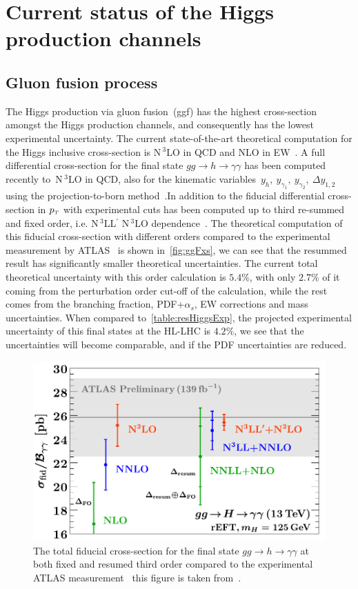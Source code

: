 \section{Current status of the Higgs production channels  \label{sec:singlehiggschannels}  }
\subsection{Gluon fusion process}
The Higgs production via gluon fusion~(ggf)  has the highest cross-section amongst the Higgs production channels, and consequently has the lowest experimental uncertainty. The current state-of-the-art theoretical computation for the Higgs inclusive cross-section is N$\,^3$LO in QCD and NLO in EW~\cite{Bonetti:2018ukf}. A full differential cross-section for the final state $ gg \to h \to \gamma \gamma$ has been computed recently to~N$\,^3$LO in QCD, also for the kinematic variables~$y_h, \ y_{\gamma_1},\ y_{\gamma_2},\ \Delta y_{1,2}$ using the projection-to-born method~\cite{Chen:2021isd}.In addition to the fiducial differential cross-section in $p_{\scriptscriptstyle T}$ with experimental cuts has been computed up to third re-summed and fixed order, i.e.  N$\,^3$LL$^\prime$   N$\,^3$LO dependence~\cite{Billis:2021ecs}. The theoretical computation of this fiducial cross-section with different orders compared to the experimental measurement by ATLAS~\cite{ATLAS:2019jst} is shown in~\autoref{fig:ggFxs}, we can see that the resummed result has significantly smaller theoretical uncertainties. The current total theoretical uncertainty with this order calculation is $5.4 \%$, with only $2.7\%$ of it coming from the perturbation order cut-off of the calculation, while the rest comes from the branching fraction, PDF+$\alpha_s$, EW corrections and mass uncertainties. When compared to~\autoref{table:resHiggsExp}, the projected experimental uncertainty of this final states at the HL-LHC is $4.2\%$, we see that the uncertainties will become comparable, and if the PDF uncertainties are reduced.
\begin{figure}[htbp!]
	\begin{center}
		\includegraphics[width=.7\textwidth]{figures/total_xs_fid}
		\caption{ The total fiducial cross-section for the final state  $ gg \to h \to \gamma \gamma$ at both fixed and resumed third order compared to the experimental ATLAS measurement~\cite{ATLAS:2019jst} this figure is taken from~\cite{Billis:2021ecs}. \label{fig:ggFxs} }
	\end{center}
\end{figure}
